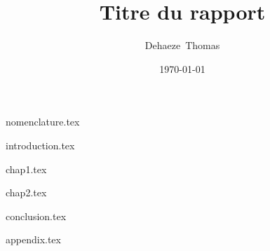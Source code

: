 \documentclass[%
    paper=A4,               %
    twoside=true,           %
    openany,                %
    chapterprefix=true,     %
    12pt,                   %
    headings=normal,        %
    bibliography=totoc,     %
    titlepage=on,           %
    captions=tableabove,    %
    draft=false             %
]{book}%
\newcommand{\rapportTitle}{Titre du rapport}
\newcommand{\rapportAuthor}{Dehaeze~Thomas}
\newcommand{\rapportDate}{\today}
\begin{document}

\frontmatter

\title{\rapportTitle}
\author{\rapportAuthor}
\date{\rapportDate}

\maketitle %
\tableofcontents{} %
\listoffigures{} %
{nomenclature.tex}


\mainmatter

{introduction.tex}

{chap1.tex}

{chap2.tex}

{conclusion.tex}



\begin{appendices}
{appendix.tex}
\end{appendices}


\backmatter
\newpage
\printbibliography[
    heading=bibintoc
]
\end{document}
